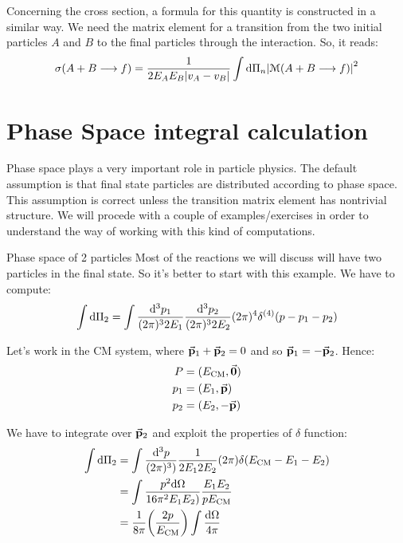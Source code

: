 \documentclass[../../main/main.tex]{subfiles}
\begin{document}
Concerning the cross section, a formula for this quantity is constructed in a similar way. We need the matrix element for a transition from the two initial particles \( A \) and \( B \) to the final particles through the interaction. So, it reads:
\begin{equation}
    \sigma(A + B \longrightarrow f)
    =
    \frac{1}{2 E_A E_B \abs{v_A - v_B}} \int \mathrm{d}{\Pi_n} \abs{\mathcal{M}(A + B \longrightarrow f)}^2
    \label{eq:L03_FGRCS}
\end{equation}





\section{Phase Space integral calculation}
Phase space plays a very important role in particle physics. The default assumption is that final state particles are distributed according to phase space. This assumption is correct unless the transition matrix element has nontrivial structure.
We will procede with a couple of examples/exercises in order to understand the way of working with this kind of computations.

\medskip
\begin{example}{Phase space of 2 particles}{}
	Most of the reactions we will discuss will have two particles in the final state. So it's better to start with this example. We have to compute:
    \begin{equation}
        \int \mathrm{d}{\Pi_2}
        =
        \int \frac{\mathrm{d}{^3 p_1}}{(2\pi)^3 2 E_1} \frac{\mathrm{d}{^3 p_2}}{(2\pi)^3 2 E_2} (2\pi)^4 \delta^{(4)} \qty(p - p_1 - p_2 )
        \label{eq:}
    \end{equation}

    Let's work in the CM system, where \( \va{p}_1 + \va{p}_2 = 0 \) and so \( \va{p}_1 = - \va{p}_2 \). Hence:
	\begin{subequations}
		\begin{align}
			P	&= (E_\mathrm{CM}, \va{0}) \\
			p_1	&= (E_1, \va{p}) \\
			p_2	&= (E_2, -\va{p})
		\end{align}
		\label{eq:L03_2PPSD}
	\end{subequations}

	We have to integrate over \( \va{p}_2 \) and exploit the properties of \( \delta \) function:
    \begin{align}
        \int \mathrm{d}{\Pi_2}
        &=
		\int \frac{\mathrm{d}{^3 p}}{(2\pi)^3)} \frac{1}{2 E_1 2 E_2} (2\pi) \delta(E_\mathrm{CM} - E_1 - E_2) \nonumber \\
		&=
        \int \frac{p^2 \mathrm{d}{\Omega}}{16 \pi^2 E_1 E_2)} \frac{E_1 E_2}{p E_\mathrm{CM}} \nonumber \\
		&=
		\frac{1}{8\pi} \qty(\frac{2p}{E_\mathrm{CM}}) \int \frac{\mathrm{d}{\Omega}}{4\pi}
        \label{eq:L03_2PPSI}
    \end{align}
\end{example}
\end{document}
